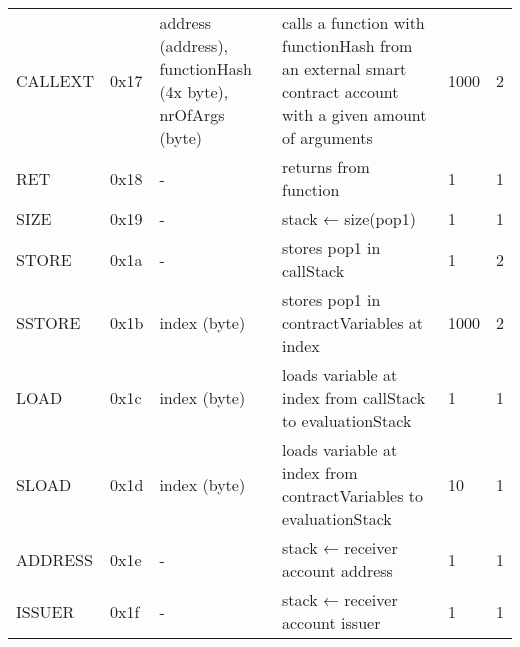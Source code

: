 \begin{longtable}[c]{L{2.5cm} L{1cm} L{3cm} L{5.5cm} R{0.8cm} R{1cm} }
CALLEXT   & 0x17   & address (address), functionHash (4x byte), nrOfArgs (byte) 
	& calls a function with functionHash from an external smart contract account with a given amount of arguments & 1000         & 2          \\
RET       & 0x18   & -                                                                                                        & returns from function                                                                                       & 1         & 1          \\
SIZE      & 0x19   & -                                                                                                        & stack ← size(pop1)                                                                                          & 1         & 1          \\
STORE     & 0x1a   & -                                                                                                        & stores pop1 in callStack                                                                                    & 1         & 2          \\
SSTORE    & 0x1b   & index (byte)                                                                                             & stores pop1 in contractVariables at index                                                                   & 1000      & 2          \\
LOAD      & 0x1c   & index (byte)                                                                                             & loads variable at index from callStack to evaluationStack                                                   & 1         & 1          \\
SLOAD     & 0x1d   & index (byte)                                                                                             & loads variable at index from contractVariables to evaluationStack                                           & 10       & 1          \\
ADDRESS   & 0x1e   & -                                                                                                        & stack ← receiver account address                                                                            & 1         & 1          \\
ISSUER    & 0x1f   & -                                                                                                        & stack ← receiver account issuer                                                                             & 1         & 1          \\

\end{longtable}
